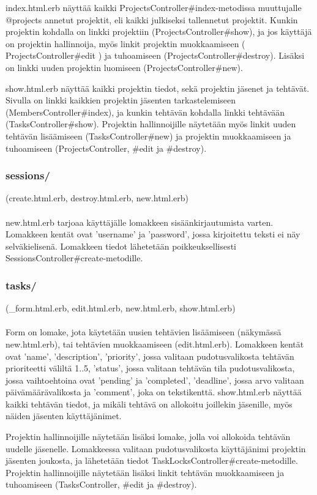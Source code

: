 \documentclass[12pt,a4paper]{article}
\begin{document}
index.html.erb näyttää kaikki ProjectsController\#index-metodissa muuttujalle @projects
annetut projektit, eli kaikki julkiseksi tallennetut projektit. Kunkin projektin kohdalla on linkki
projektiin (ProjectsController\#show), ja jos käyttäjä on projektin hallinnoija, myös linkit
projektin muokkaamiseen ( ProjectsController\#edit ) ja tuhoamiseen
(ProjectsController\#destroy). Lisäksi on linkki uuden projektin luomiseen
(ProjectsController\#new).

show.html.erb näyttää kaikki projektin tiedot, sekä projektin jäsenet ja tehtävät. Sivulla on
linkki kaikkien projektin jäsenten tarkastelemiseen (MembersController\#index), ja kunkin
tehtävän kohdalla linkki tehtävään (TasksController\#show).
Projektin hallinnoijille näytetään myös linkit uuden tehtävän lisäämiseen
(TasksController\#new) ja projektin muokkaamiseen ja tuhoamiseen (ProjectsController,
\#edit ja \#destroy).
\subsubsection*{sessions/}
(create.html.erb, destroy.html.erb, new.html.erb)\\\\
new.html.erb tarjoaa käyttäjälle lomakkeen sisäänkirjautumista varten. Lomakkeen kentät
ovat 'username' ja 'password', jossa kirjoitettu teksti ei näy selväkielisenä. Lomakkeen
tiedot lähetetään poikkeuksellisesti SessionsController\#create-metodille.

\subsubsection*{tasks/}
(\_form.html.erb, edit.html.erb, new.html.erb, show.html.erb)\\\\
Form on lomake, jota käytetään uusien tehtävien lisäämiseen (näkymässä new.html.erb),
tai tehtävien muokkaamiseen (edit.html.erb). Lomakkeen kentät ovat 'name', 'description',
'priority', jossa valitaan pudotusvalikosta tehtävän prioriteetti väliltä 1..5, 'status', jossa
valitaan tehtävän tila pudotusvalikosta, jossa vaihtoehtoina ovat 'pending' ja 'completed',
'deadline', jossa arvo valitaan päivämäärävalikosta ja 'comment', joka on tekstikenttä.
show.html.erb näyttää kaikki tehtävän tiedot, ja mikäli tehtävä on allokoitu joillekin jäsenille,
myös näiden jäsenten käyttäjänimet.

Projektin hallinnoijille näytetään lisäksi lomake, jolla voi allokoida tehtävän uudelle
jäsenelle. Lomakkeessa valitaan pudotusvalikosta käyttäjänimi projektin jäsenten joukosta,
ja lähetetään tiedot TaskLocksController\#create-metodille.
Projektin hallinnoijille näytetään lisäksi linkit tehtävän muokkaamiseen ja tuhoamiseen
(TasksController, \#edit ja \#destroy).
\end{document}
